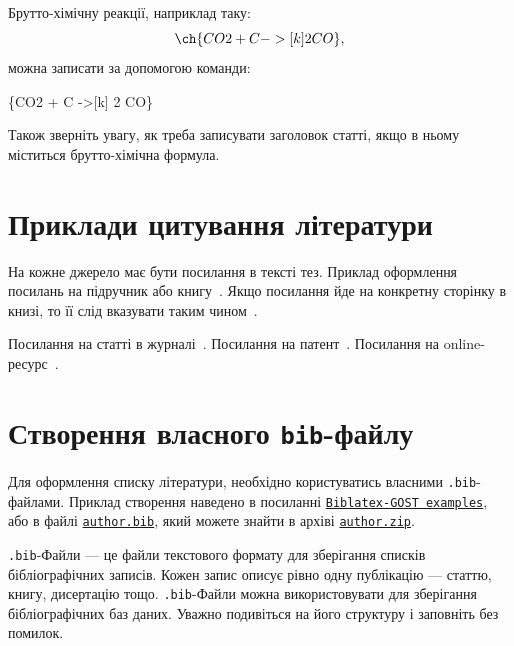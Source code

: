 \documentclass[]{iptconf}
\let\babelch\ch %
\let\chemch\ch
\let\ch\babelch
\def\templateurl{%
\href{https://drive.google.com/file/d/1YrrTXnwaIcydBJLFS5BM6uj-yosnkRl3/view}%
{\texttt{author.zip}}}
\begin{document}
Брутто-хімічну реакції, наприклад таку:
\begin{equation*}
	\chemch{CO2 + C ->[k] 2 CO},
\end{equation*}
можна записати за допомогою команди:
\begin{center}
	\string\chemch\{CO2 + C ->[k] 2 CO\}
\end{center}

Також зверніть увагу, як треба записувати заголовок статті, якщо в ньому міститься брутто-хімічна формула.

\section{Приклади цитування літератури}

На кожне джерело має бути посилання в тексті тез. Приклад оформлення посилань на підручник або книгу~\cite{CookPhysTime, Siv1}. Якщо посилання йде на конкретну сторінку в книзі, то її слід вказувати таким чином~\cite[стор. 120]{Siv1}.

Посилання на статті в журналі~\cite{Hanson, CookPhysTime, astro-ph/9801252}. Посилання на патент~\cite{patent}. Посилання на online-ресурс~\cite{leinster}.

\section{Створення власного \texttt{bib}-файлу}

Для оформлення списку літератури, необхідно користуватись власними \texttt{.bib}-файлами. Приклад створення наведено в посиланні
\href{https://ctan.math.illinois.edu/macros/latex/contrib/biblatex-contrib/biblatex-gost/doc/biblatex-gost-examples.pdf}{\texttt{Biblatex-GOST
		examples}}, або в файлі \href{run:author.bib}{\texttt{author.bib}}, який можете знайти в архіві \templateurl.

\texttt{.bib}-Файли --- це файли текстового формату для зберігання списків бібліографічних записів. Кожен запис описує рівно одну публікацію --- статтю, книгу, дисертацію тощо. \texttt{.bib}-Файли можна використовувати для зберігання бібліографічних баз даних. Уважно подивіться на його структуру і заповніть без помилок.
\end{document}

